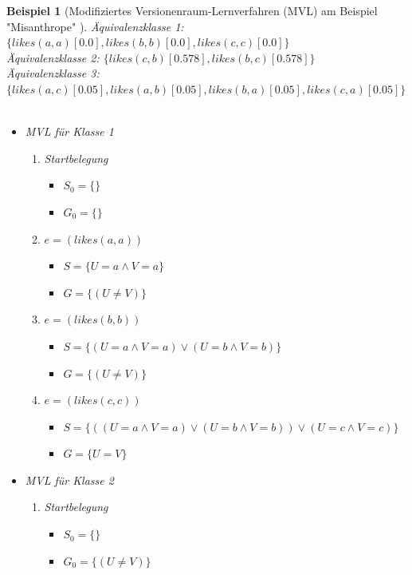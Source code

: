\documentclass[a4paper, 11pt]{book}
\newtheorem{Bsp}{Beispiel}[section]
\begin{document}
\begin{Bsp}[Modifiziertes Versionenraum-Lernverfahren (MVL) am Beispiel "{}Misanthrope"{} ]	
\noindent
Äquivalenzklasse 1: $ \{likes(a,a)[0.0], likes(b,b)[0.0], likes(c,c)[0.0]\} $\\
Äquivalenzklasse 2: $ \{likes(c,b)[0.578], likes(b,c)[0.578]\} $\\
Äquivalenzklasse 3: $ \{likes(a,c)[0.05], likes(a,b)[0.05], likes(b,a)[0.05], likes(c,a)[0.05]\} $\\
\\
\noindent
\begin{itemize}
	\item MVL für Klasse 1
	\begin{enumerate}
		\item Startbelegung
		\begin{itemize}
			\item $ S_0 = \{\}$ 
			\item $ G_0 = \{\} $
		\end{itemize}
		\item $ e = (likes(a,a)) $
		\begin{itemize}
			\item $ S = \{U = a \land V = a\}$ 
			\item $ G = \{(U \neq V)\} $
		\end{itemize}
		\item $ e = (likes(b,b)) $
		\begin{itemize}
			\item $ S = \{(U = a \land V = a) \lor (U = b \land V = b)\}$ 
			\item $ G = \{(U \neq V)\} $
		\end{itemize}
		\item $ e = (likes(c,c)) $
		\begin{itemize}
		    \item $ S = \{((U = a \land V = a) \lor (U = b \land V = b)) \lor (U = c \land V = c)\}$ 
			\item $ G = \{U = V\} $
		\end{itemize}	
	\end{enumerate}
	\item MVL für Klasse 2
	\begin{enumerate}
		\item Startbelegung
		\begin{itemize}
			\item $ S_0 = \{\}$ 
			\item $ G_0 = \{(U \neq V)\} $
		\end{itemize}

\end{enumerate}
\end{itemize}
\end{Bsp}
\end{document}
